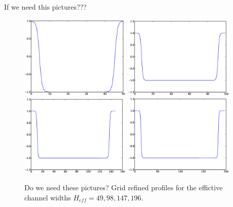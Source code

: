 \documentclass{article}
\begin{document}
{\color{red} If we need this pictures???
\begin{figure}
\includegraphics[width=0.47\textwidth]{Figures/grid_phase_prof_49.eps}\hfill
\includegraphics[width=0.47\textwidth]{Figures/grid_phase_prof_98.eps}\\
\includegraphics[width=0.47\textwidth]{Figures/grid_phase_prof_147.eps}\hfill
\includegraphics[width=0.47\textwidth]{Figures/grid_phase_prof_196.eps}\\
\caption{Do we need these pictures? Grid refined profiles for the effictive
channel widths
$H_{eff}=49,98,147,196$.\label{fig:grid:profiles}}
\end{figure}
}
\end{document}
